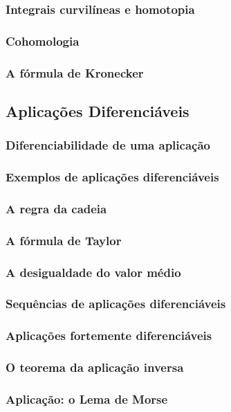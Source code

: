 \documentclass{article}
\theoremstyle{plain}
\theoremstyle{definition}
\theoremstyle{remark}
\begin{document}
   \subsubsection{Integrais curvilíneas e homotopia}
   \subsubsection{Cohomologia}
   \subsubsection{ A fórmula de Kronecker}
\subsection{ Aplicações Diferenciáveis}
   \subsubsection{Diferenciabilidade de uma aplicação}
   \subsubsection{Exemplos de aplicações diferenciáveis}
   \subsubsection{A regra da cadeia}
   \subsubsection{A fórmula de Taylor}
   \subsubsection{A desigualdade do valor médio}
   \subsubsection{Sequências de aplicações diferenciáveis}
   \subsubsection{Aplicações fortemente diferenciáveis}
   \subsubsection{O teorema da aplicação inversa}
   \subsubsection{Aplicação: o Lema de Morse}
\end{document}
